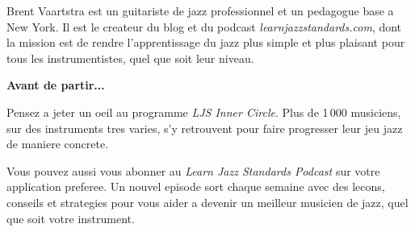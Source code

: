 \documentclass[11pt,a4paper]{article}
\begin{document}
Brent Vaartstra est un guitariste de jazz professionnel et un pedagogue base a New York.
Il est le createur du blog et du podcast \textit{learnjazzstandards.com}, dont la mission est de
rendre l'apprentissage du jazz plus simple et plus plaisant pour tous les instrumentistes, quel
que soit leur niveau.

\vspace{1em}

{\Large\bfseries Avant de partir...}

\vspace{0.35em}

Pensez a jeter un oeil au programme \textit{LJS Inner Circle}. Plus de 1\,000 musiciens, sur des
instruments tres varies, s'y retrouvent pour faire progresser leur jeu jazz de maniere concrete.

Vous pouvez aussi vous abonner au \textit{Learn Jazz Standards Podcast} sur votre application
preferee. Un nouvel episode sort chaque semaine avec des lecons, conseils et strategies pour
vous aider a devenir un meilleur musicien de jazz, quel que soit votre instrument.
\end{document}
